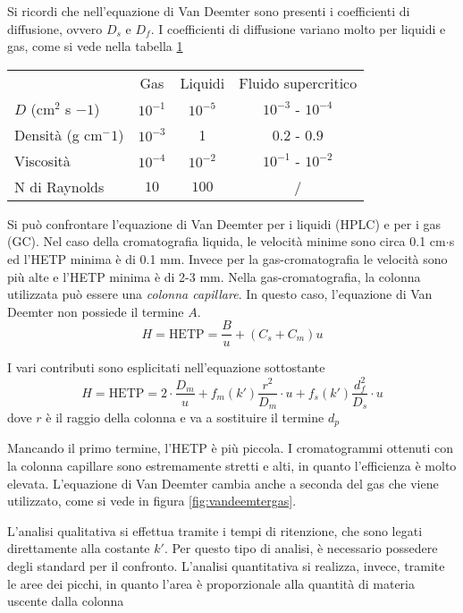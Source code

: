 Si ricordi che nell'equazione di Van Deemter sono presenti i coefficienti di diffusione, ovvero $D_s$ e $D_f$.
I coefficienti di diffusione variano molto per liquidi e gas, come si vede nella tabella \ref{tab:diffusione}

\begin{table}
\begin{tabular}{lccc}
 & Gas & Liquidi & Fluido supercritico\\
$D$ (cm$^2$ s $-1$) & $10^{-1}$ & $10^{-5}$ & $10^{-3}$ - $10^{-4}$\\
Densità (g cm$^-1$) & $10^{-3}$ & 1 & $0.2$ - $0.9$\\
Viscosità & $10^{-4}$ & $10^{-2}$ & $10^{-1}$ - $10^{-2}$\\
N di Raynolds & $10$ & $100$ & /\\
\end{tabular}
\label{tab:diffusione}
\end{table}


Si può confrontare l'equazione di Van Deemter per i liquidi (HPLC) e per i gas (GC).
Nel caso della cromatografia liquida, le velocità minime sono circa 0.1 cm$\cdot$s ed l'HETP minima è di 0.1 mm.
Invece per la gas-cromatografia le velocità sono più alte e l'HETP minima è di 2-3 mm.
Nella gas-cromatografia, la colonna utilizzata può essere una \emph{colonna capillare}.
In questo caso, l'equazione di Van Deemter non possiede il termine $A$.
\[
H = \text{HETP} = \frac{B}{u} + (C_s + C_m)u
\]

I vari contributi sono esplicitati nell'equazione sottostante
\[
H = \text{HETP} = 2 \cdot \frac{D_m}{u} + f_m (k') \frac{r^2}{D_m} \cdot u
 + f_s (k') \frac{d_f^2}{D_s} \cdot u
\]
dove $r$ è il raggio della colonna e va a sostituire il termine $d_p$

Mancando il primo termine, l'HETP è più piccola.
I cromatogrammi ottenuti con la colonna capillare sono estremamente stretti e alti, in quanto l'efficienza è molto elevata.
L'equazione di Van Deemter cambia anche a seconda del gas che viene utilizzato, come si vede in figura \ref{fig:vandeemtergas}.


L'analisi qualitativa si effettua tramite i tempi di ritenzione, che sono legati direttamente alla costante $k'$.
Per questo tipo di analisi, è necessario possedere degli standard per il confronto.
L'analisi quantitativa si realizza, invece, tramite le aree dei picchi, in quanto l'area è proporzionale alla quantità di materia uscente dalla colonna

